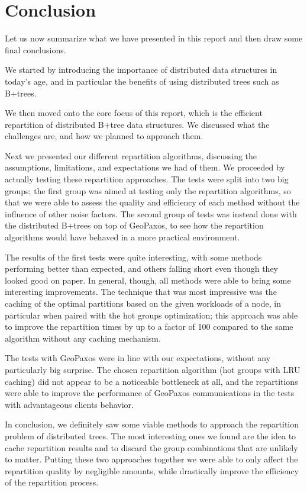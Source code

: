 \chapter{Conclusion}\label{sec:Conclusion}
Let us now summarize what we have presented in this report and then draw some final conclusions.

We started by introducing the importance of distributed data structures in today's age, and in particular the benefits of using distributed trees such as B+trees. 

We then moved onto the core focus of this report, which is the efficient repartition of distributed B+tree data structures. We discussed what the challenges are, and how we planned to approach them.

Next we presented our different repartition algorithms, discussing the assumptions, limitations, and expectations we had of them. We proceeded by actually testing these repartition approaches. The tests were split into two big groups; the first group was aimed at testing only the repartition algorithms, so that we were able to assess the quality and efficiency of each method without the influence of other noise factors. The second group of tests was instead done with the distributed B+trees on top of GeoPaxos, to see how the repartition algorithms would have behaved in a more practical environment.

The results of the first tests were quite interesting, with some methods performing better than expected, and others falling short even though they looked good on paper. In general, though, all methods were able to bring some interesting improvements. The technique that was most impressive was the caching of the optimal partitions based on the given workloads of a node, in particular when paired with the hot groups optimization; this approach was able to improve the repartition times by up to a factor of 100 compared to the same algorithm without any caching mechanism. 

The tests with GeoPaxos were in line with our expectations, without any particularly big surprise. The chosen repartition algorithm (hot groups with LRU caching) did not appear to be a noticeable bottleneck at all, and the repartitions were able to improve the performance of GeoPaxos communications in the tests with advantageous clients behavior.

In conclusion, we definitely saw some viable methods to approach the repartition problem of distributed trees. The most interesting ones we found are the idea to cache repartition results and to discard the group combinations that are unlikely to matter. Putting these two approaches together we were able to only affect the repartition quality by negligible amounts, while drastically improve the efficiency of the repartition process.

